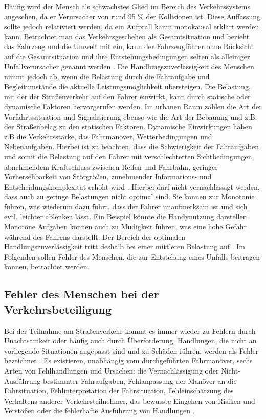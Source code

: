 Häufig wird der Mensch als schwächstes Glied im Bereich des Verkehrssystems angesehen, da er Verursacher von rund 95 \% der Kollisionen ist. Diese Auffassung sollte jedoch relativiert werden, da ein Aufprall kaum monokausal erklärt werden kann. Betrachtet man das Verkehrsgeschehen als Gesamtsituation und bezieht das Fahrzeug und die Umwelt mit ein, kann der Fahrzeugführer ohne Rücksicht auf die Gesamtsituation und ihre Entstehungsbedingungen selten als alleiniger Unfallverursacher genannt werden \parencite[S. 269]{Burg.2017}. Die Handlungszuverlässigkeit des Menschen nimmt jedoch ab, wenn die Belastung durch die Fahraufgabe und Begleitumstände die aktuelle Leistungsmöglichkeit übersteigen. Die Belastung, mit der der Straßenverkehr auf den Fahrer einwirkt, kann durch statische oder dynamische Faktoren hervorgerufen werden. Im urbanen Raum zählen die Art der Vorfahrtssituation und Signalisierung ebenso wie die Art der Bebauung und z.B. der Straßenbelag zu den statischen Faktoren. Dynamische Einwirkungen haben z.B die Verkehrsstärke, das Fahrmanöver, Wetterbedingungen und Nebenaufgaben. Hierbei ist zu beachten, dass die Schwierigkeit der Fahraufgaben und somit die Belastung auf den Fahrer mit verschlechterten Sichtbedingungen, abnehmendem Kraftschluss zwischen Reifen und Fahrbahn, geringer Vorhersehbarkeit von Störgrößen, zunehmender Informations- und Entscheidungskomplexität erhöht wird \parencite[S. 132]{Reichart.2001}. Hierbei darf nicht vernachlässigt werden, dass auch zu geringe Belastungen nicht optimal sind. Sie können zur Monotonie führen, was wiederum dazu führt, dass der Fahrer unaufmerksam ist und sich evtl. leichter ablenken lässt. Ein Beispiel könnte die Handynutzung darstellen. Monotone Aufgaben können auch zu Müdigkeit führen, was eine hohe Gefahr während des Fahrens darstellt. Der Bereich der optimalen Handlungszuverlässigkeit tritt deshalb bei einer mittleren Belastung auf \parencite[S. 270]{Burg.2017}. Im Folgenden sollen Fehler des Menschen, die zur Entstehung eines Unfalls beitragen können, betrachtet werden.

\subsection{Fehler des Menschen bei der Verkehrsbeteiligung}\label{Fehler des Menschen bei der Verkehrsbeteiligung}
Bei der Teilnahme am Straßenverkehr kommt es immer wieder zu Fehlern durch Unachtsamkeit oder häufig auch durch Überforderung. Handlungen, die nicht an vorliegende Situationen angepasst sind und zu Schäden führen, werden als Fehler bezeichnet \parencite[S. 17]{Gerstenberger.17.02.2015}. Es existieren, unabhängig vom durchgeführten Fahrmanöver, sechs Arten von Fehlhandlungen und Ursachen: die Vernachlässigung oder Nicht-Ausführung bestimmter Fahraufgaben, Fehlanpassung der Manöver an die Fahrsituation, Fehlinterpretation der Fahrsituation, Fehleinschätzung des Verhaltens anderer Verkehrsteilnehmer,  das bewusste Eingehen von Risiken und Verstößen oder die fehlerhafte Ausführung von Handlungen \parencite[S. 32f]{Vollrath.2006}. %

